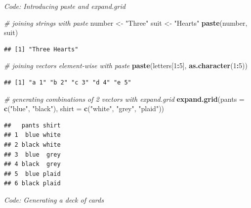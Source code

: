 \documentclass[
]{article}
\newenvironment{Shaded}{\begin{snugshade}}{\end{snugshade}}
\newcommand{\CommentTok}[1]{\textcolor[rgb]{0.56,0.35,0.01}{\textit{#1}}}
\newcommand{\DataTypeTok}[1]{\textcolor[rgb]{0.13,0.29,0.53}{#1}}
\newcommand{\DecValTok}[1]{\textcolor[rgb]{0.00,0.00,0.81}{#1}}
\newcommand{\KeywordTok}[1]{\textcolor[rgb]{0.13,0.29,0.53}{\textbf{#1}}}
\newcommand{\NormalTok}[1]{#1}
\newcommand{\OperatorTok}[1]{\textcolor[rgb]{0.81,0.36,0.00}{\textbf{#1}}}
\newcommand{\StringTok}[1]{\textcolor[rgb]{0.31,0.60,0.02}{#1}}
\begin{document}
\emph{Code: Introducing paste and expand.grid}

\begin{Shaded}
\begin{Highlighting}[]
\CommentTok{\# joining strings with paste}
\NormalTok{number \textless{}{-}}\StringTok{ "Three"}
\NormalTok{suit \textless{}{-}}\StringTok{ "Hearts"}
\KeywordTok{paste}\NormalTok{(number, suit)}
\end{Highlighting}
\end{Shaded}

\begin{verbatim}
## [1] "Three Hearts"
\end{verbatim}

\begin{Shaded}
\begin{Highlighting}[]
\CommentTok{\# joining vectors element{-}wise with paste}
\KeywordTok{paste}\NormalTok{(letters[}\DecValTok{1}\OperatorTok{:}\DecValTok{5}\NormalTok{], }\KeywordTok{as.character}\NormalTok{(}\DecValTok{1}\OperatorTok{:}\DecValTok{5}\NormalTok{))}
\end{Highlighting}
\end{Shaded}

\begin{verbatim}
## [1] "a 1" "b 2" "c 3" "d 4" "e 5"
\end{verbatim}

\begin{Shaded}
\begin{Highlighting}[]
\CommentTok{\# generating combinations of 2 vectors with expand.grid}
\KeywordTok{expand.grid}\NormalTok{(}\DataTypeTok{pants =} \KeywordTok{c}\NormalTok{(}\StringTok{"blue"}\NormalTok{, }\StringTok{"black"}\NormalTok{), }\DataTypeTok{shirt =} \KeywordTok{c}\NormalTok{(}\StringTok{"white"}\NormalTok{, }\StringTok{"grey"}\NormalTok{, }\StringTok{"plaid"}\NormalTok{))}
\end{Highlighting}
\end{Shaded}

\begin{verbatim}
##   pants shirt
## 1  blue white
## 2 black white
## 3  blue  grey
## 4 black  grey
## 5  blue plaid
## 6 black plaid
\end{verbatim}

\emph{Code: Generating a deck of cards}
\end{document}
